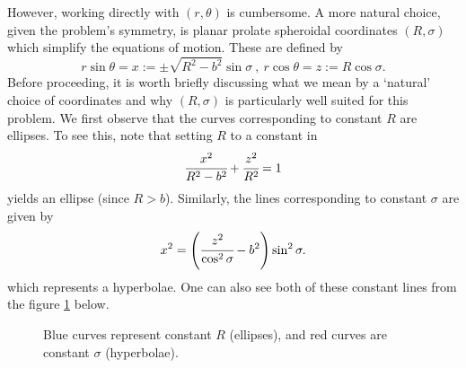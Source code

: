 \documentclass[12pt,oneside]{report}
\theoremstyle{definition}
\begin{document}
However, working directly with $(r,\theta)$ is cumbersome. A more natural choice, given the problem's symmetry, is planar prolate spheroidal coordinates $(R,\sigma)$ which simplify the equations of motion. These are defined by
\begin{equation} \label{3.3}
    r\sin{\theta} = x :=  \pm \sqrt{R^{2} - b^{2}}\sin{\sigma} \ , \  r\cos{\theta} = z := R\cos{\sigma}.
\end{equation}
Before proceeding, it is worth briefly discussing what we mean by a `natural' choice of coordinates and why $(R,\sigma)$ is particularly well suited for this problem. We first observe that the curves corresponding to constant $R$ are ellipses. To see this, note that setting $R$ to a constant in
$$ \cfrac{x^{2}}{R^{2}-b^{2}} + \cfrac{z^{2}}{R^{2}} = 1$$
yields an ellipse (since $R>b$). Similarly, the lines corresponding to constant $\sigma$ are given by  
$$ x^{2} = \left( \cfrac{z^{2}}{\cos^{2}{\sigma}} - b^{2}\right)\sin^{2}{\sigma}.$$
which represents a hyperbolae. One can also see both of these constant lines from the figure \ref{fig:coordinate-transformation} below. 
\begin{figure}[ht]
  \centering
  \caption{Blue curves represent constant $R$ (ellipses), and red curves are constant $\sigma$ (hyperbolae).}
  \label{fig:coordinate-transformation}
\end{figure}
\end{document}
